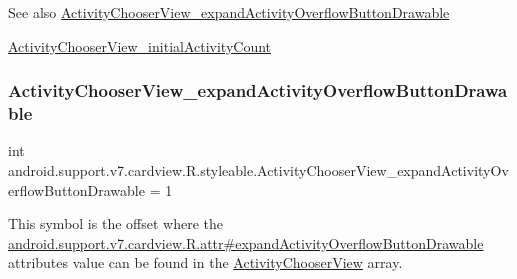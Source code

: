 \begin{DoxySeeAlso}{See also}
\hyperlink{classandroid_1_1support_1_1v7_1_1cardview_1_1R_1_1styleable_ae76866cabdcba66de1df2213070ad829}{Activity\+Chooser\+View\+\_\+expand\+Activity\+Overflow\+Button\+Drawable} 

\hyperlink{classandroid_1_1support_1_1v7_1_1cardview_1_1R_1_1styleable_a3cf4fe79fcc5864408ce4243825dbbb8}{Activity\+Chooser\+View\+\_\+initial\+Activity\+Count} 
\end{DoxySeeAlso}
\mbox{\label{classandroid_1_1support_1_1v7_1_1cardview_1_1R_1_1styleable_ae76866cabdcba66de1df2213070ad829}} 
\subsubsection{\texorpdfstring{Activity\+Chooser\+View\+\_\+expand\+Activity\+Overflow\+Button\+Drawable}{ActivityChooserView\_expandActivityOverflowButtonDrawable}}
{\footnotesize\ttfamily int android.\+support.\+v7.\+cardview.\+R.\+styleable.\+Activity\+Chooser\+View\+\_\+expand\+Activity\+Overflow\+Button\+Drawable = 1\hspace{0.3cm}{\ttfamily [static]}}

This symbol is the offset where the \hyperlink{classandroid_1_1support_1_1v7_1_1cardview_1_1R_1_1attr_a8f85e7e29323492d9ca305428b27de38}{android.\+support.\+v7.\+cardview.\+R.\+attr\#expand\+Activity\+Overflow\+Button\+Drawable} attribute\textquotesingle{}s value can be found in the \hyperlink{classandroid_1_1support_1_1v7_1_1cardview_1_1R_1_1styleable_a97ba41af4dd02474df8be813e34fb7ac}{Activity\+Chooser\+View} array.

